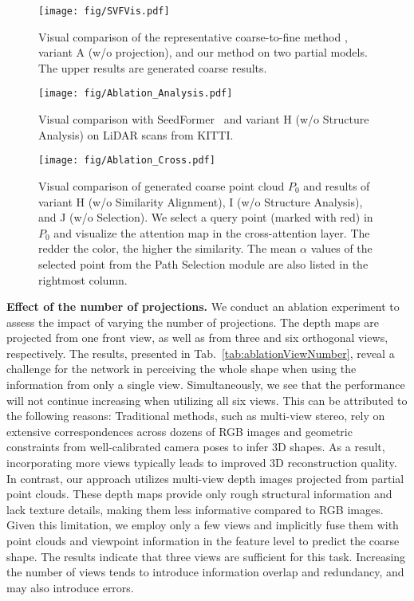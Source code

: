 \begin{figure}[h]
  \centering
  \texttt{[image: fig/SVFVis.pdf]}
\caption{Visual comparison of the representative coarse-to-fine method \citep{zhou2022seedformer}, variant A (w/o projection), and our method on two partial models. The upper results are generated coarse results.}
  \label{fig:MVFVis}
\end{figure}

\begin{figure}[h]
  \centering
  \texttt{[image: fig/Ablation\_Analysis.pdf]}
\caption{Visual comparison with SeedFormer~\citep{zhou2022seedformer} and variant H (w/o Structure Analysis) on LiDAR scans from KITTI.}
  \label{fig:Ablation_Analysis}
\end{figure}

\begin{figure*}[h]
  \centering
  \texttt{[image: fig/Ablation\_Cross.pdf]}
\caption{
Visual comparison of generated coarse point cloud $P_0$ and results of variant H (w/o Similarity Alignment), I (w/o Structure Analysis), and J (w/o Selection). 
We select a query point (marked with red) in $P_0$ and visualize the attention map in the cross-attention layer. The redder the color, the higher the similarity. The mean $\alpha$ values of the selected point from the Path Selection module are also listed in the rightmost column.
}
  \label{fig:Ablation_cross}
\end{figure*}

\noindent\textbf{Effect of the number of projections.} 
We conduct an ablation experiment to assess the impact of varying the number of projections. The depth maps are projected from one front view, as well as from three and six orthogonal views, respectively. The results, presented in Tab.~\ref{tab:ablationViewNumber}, reveal a challenge for the network in perceiving the whole shape when using the information from only a single view.
Simultaneously, we see that the performance will not continue increasing when utilizing all six views.
This can be attributed to the following reasons:
Traditional methods, such as multi-view stereo, rely on extensive correspondences across dozens of RGB images and geometric constraints from well-calibrated camera poses to infer 3D shapes. As a result, incorporating more views typically leads to improved 3D reconstruction quality.
In contrast, our approach utilizes multi-view depth images projected from partial point clouds. These depth maps provide only rough structural information and lack texture details, making them less informative compared to RGB images. 
Given this limitation, we employ only a few views and implicitly fuse them with point clouds and viewpoint information in the feature level to predict the coarse shape. The results indicate that three views are sufficient for this task. Increasing the number of views tends to introduce information overlap and redundancy, and may also introduce errors. 


